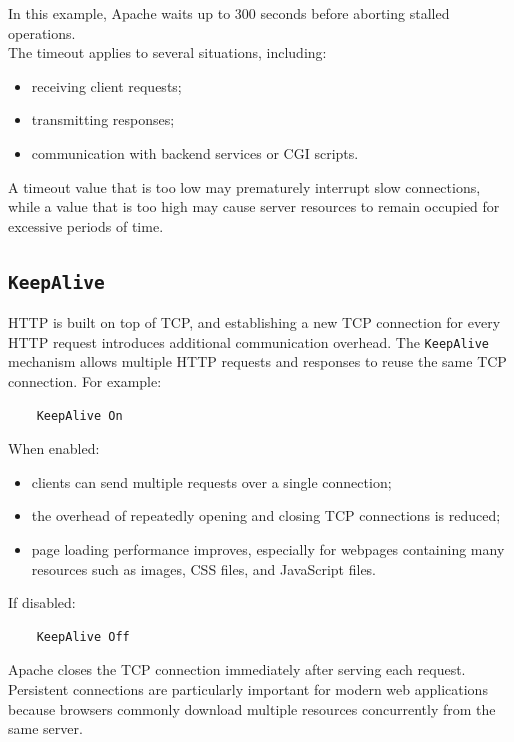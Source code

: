 \documentclass{scrbook}
\begin{document}
	In this example, Apache waits up to 300 seconds before aborting stalled operations.\\
	
	The timeout applies to several situations, including:
	\begin{itemize}
		\item receiving client requests;
		\item transmitting responses;
		\item communication with backend services or CGI scripts.
	\end{itemize}
	
	A timeout value that is too low may prematurely interrupt slow connections, while a value that is too high may cause server resources to remain occupied for excessive periods of time.
	
	\subsection{\texttt{KeepAlive}}
	
	HTTP is built on top of TCP, and establishing a new TCP connection for every HTTP request introduces additional communication overhead. The \texttt{KeepAlive} mechanism allows multiple HTTP requests and responses to reuse the same TCP connection. For example:
	\begin{lstlisting}
	KeepAlive On
	\end{lstlisting}
	
	When enabled:
	\begin{itemize}
		\item clients can send multiple requests over a single connection;
		\item the overhead of repeatedly opening and closing TCP connections is reduced;
		\item page loading performance improves, especially for webpages containing many resources such as images, CSS files, and JavaScript files.
	\end{itemize}
	
	If disabled:
	\begin{lstlisting}
	KeepAlive Off
	\end{lstlisting}
	
	Apache closes the TCP connection immediately after serving each request.\\
	
	Persistent connections are particularly important for modern web applications because browsers commonly download multiple resources concurrently from the same server.
	
\end{document}
